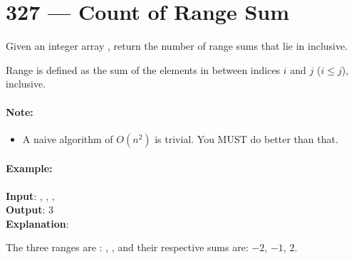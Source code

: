 \section{327 --- Count of Range Sum}
Given an integer array , return the number of range sums that lie in  inclusive.

Range  is defined as the sum of the elements in  between indices $i$ and $j$ ($i \leq j$), inclusive.

\paragraph{Note:}
\begin{itemize}
\item A naive algorithm of $ O(n^2) $ is trivial. You MUST do better than that.
\end{itemize}

\paragraph{Example:}

\begin{flushleft}
\textbf{Input}: , , ,
\\
\textbf{Output}: 3 
\\
\textbf{Explanation}: 

The three ranges are : \fcj{[0,0]}, \fcj{[2,2]}, \fcj{[0,2]} and their respective sums are: $-2$, $-1$, $2$.

\end{flushleft}
